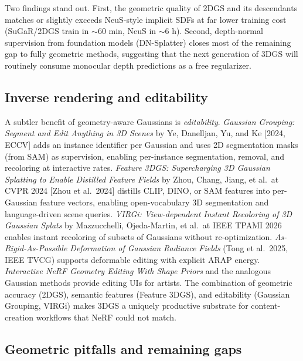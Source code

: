 Two findings stand out. First, the geometric quality of 2DGS and its descendants matches or slightly exceeds NeuS-style implicit SDFs at far lower training cost (SuGaR/2DGS train in \(\sim 60\) min, NeuS in \(\sim 6\) h). Second, depth-normal supervision from foundation models (DN-Splatter) closes most of the remaining gap to fully geometric methods, suggesting that the next generation of 3DGS will routinely consume monocular depth predictions as a free regularizer.

\subsection{Inverse rendering and editability}\label{inverse-rendering-and-editability}

A subtler benefit of geometry-aware Gaussians is \emph{editability}. \emph{Gaussian Grouping: Segment and Edit Anything in 3D Scenes} by Ye, Danelljan, Yu, and Ke {[}2024, ECCV{]} adds an instance identifier per Gaussian and uses 2D segmentation masks (from SAM) as supervision, enabling per-instance segmentation, removal, and recoloring at interactive rates. \emph{Feature 3DGS: Supercharging 3D Gaussian Splatting to Enable Distilled Feature Fields} by Zhou, Chang, Jiang, et al.~at CVPR 2024 {[}Zhou et al.~2024{]} distills CLIP, DINO, or SAM features into per-Gaussian feature vectors, enabling open-vocabulary 3D segmentation and language-driven scene queries. \emph{VIRGi: View-dependent Instant Recoloring of 3D Gaussian Splats} by Mazzucchelli, Ojeda-Martin, et al.~at IEEE TPAMI 2026 enables instant recoloring of subsets of Gaussians without re-optimization. \emph{As-Rigid-As-Possible Deformation of Gaussian Radiance Fields} (Tong et al.~2025, IEEE TVCG) supports deformable editing with explicit ARAP energy. \emph{Interactive NeRF Geometry Editing With Shape Priors} and the analogous Gaussian methods provide editing UIs for artists. The combination of geometric accuracy (2DGS), semantic features (Feature 3DGS), and editability (Gaussian Grouping, VIRGi) makes 3DGS a uniquely productive substrate for content-creation workflows that NeRF could not match.

\subsection{Geometric pitfalls and remaining gaps}\label{geometric-pitfalls-and-remaining-gaps}

